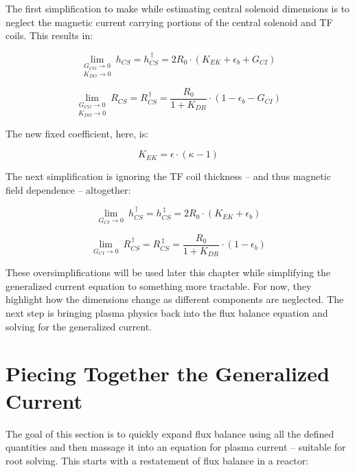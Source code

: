The first simplification to make while estimating central solenoid dimensions is to neglect the magnetic current carrying portions of the central solenoid and TF coils. This results in:

\begin{equation}
	\underset{K_{DO} \to 0}{\underset{G_{CO} \to 0}{\lim}} \ h_{CS} = h_{CS}^{\,\dagger} = 2 R_0 \cdot \left( K_{EK} + \epsilon_b + G_{CI} \right) 
\end{equation}

\begin{equation}
	\underset{K_{DO} \to 0}{\underset{G_{CO} \to 0}{\lim}} \ R_{CS} = R_{CS}^{\,\dagger} = \frac{ R_0 }{ 1 + K_{DR} } \cdot \left( 1 - \epsilon_b - G_{CI}  \right)
\end{equation}

The new fixed coefficient, here, is:

\begin{equation}
	K_{EK} = \epsilon \cdot \left( \kappa - 1 \right)
\end{equation}

The next simplification is ignoring the TF coil thickness -- and thus magnetic field dependence -- altogether:

\begin{equation}
	\label{eq:hcs_simple}
	\underset{G_{CI} \to 0}{\lim} \ h_{CS}^{\,\dagger} = h_{CS}^{\,\ddagger} = 2 R_0 \cdot \left( K_{EK} + \epsilon_b \right) 
\end{equation}

\begin{equation}
	\label{eq:rcs_simple}
	\underset{G_{CI} \to 0}{\lim} \ R_{CS}^{\,\dagger} = R_{CS}^{\,\ddagger} = \frac{ R_0 }{ 1 + K_{DR} } \cdot \left( 1 - \epsilon_b  \right)
\end{equation}

These oversimplifications will be used later this chapter while simplifying the generalized current equation to something more tractable. For now, they highlight how the dimensions change as different components are neglected. The next step is bringing plasma physics back into the flux balance equation and solving for the generalized current.

\section{Piecing Together the Generalized Current}

The goal of this section is to quickly expand flux balance using all the defined quantities and then massage it into an equation for plasma current -- suitable for root solving. This starts with a restatement of flux balance in a reactor:

